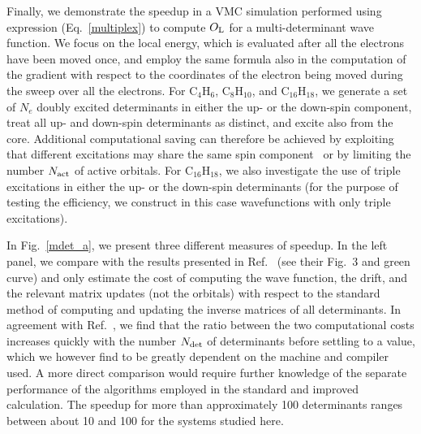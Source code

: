 \documentclass[aip,jcp,reprint,floatfix,onecolumn]{revtex4-1}
\begin{document}
Finally, we demonstrate the speedup in a VMC simulation performed using expression (Eq.~\ref{multiplex}) to compute $O_{\rm L}$ for a
multi-determinant wave function. We focus on the local energy, which is evaluated after all the electrons have been moved once, and employ
the same formula also in the computation of the gradient with respect to the coordinates of the electron being moved during the sweep over all
the electrons.  For C$_4$H$_6$, C$_8$H$_{10}$, and C$_{16}$H$_{18}$, we generate a set of $N_e$ doubly excited determinants in either the up- or the down-spin
component, treat all up- and down-spin determinants as distinct, and excite also from the core. Additional computational
saving can therefore be achieved by exploiting that different excitations may share the same spin component~\cite{Scemama15} or by limiting the number
$N_{\rm act}$ of active orbitals. For C$_{16}$H$_{18}$, we also investigate the use of triple excitations
in either the up- or the down-spin determinants (for the purpose of testing
the efficiency, we construct in this case wavefunctions with only triple
excitations).

In Fig.~\ref{mdet_a}, we present three different measures of speedup. In the left panel, we compare with the results presented in Ref.~ (see
their Fig.~3 and green curve) and only estimate the cost of computing the wave function, the drift, and the relevant matrix updates (not the orbitals)
with respect to the standard method of computing and updating the inverse matrices of all determinants. In agreement with Ref.~, we find
that the ratio between the two computational costs increases quickly with the number $N_{\rm det}$ of determinants before settling to a value, which we however
find to be greatly dependent on the machine and compiler used.
A more direct comparison would require further knowledge of the separate performance of the algorithms employed in the standard and improved calculation.
The speedup for more than approximately 100 determinants ranges between about 10 and 100 for the systems studied here.
\end{document}
